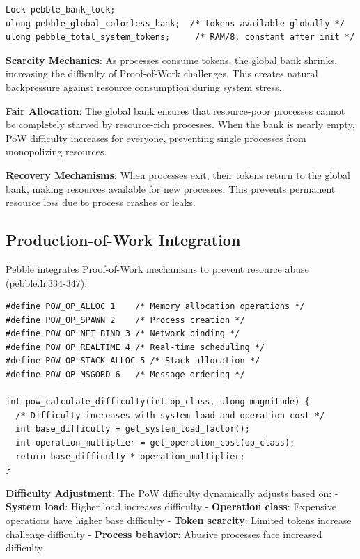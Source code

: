 \documentclass[11pt,letterpaper]{article}
\begin{document}
\begin{lstlisting}
Lock pebble_bank_lock;
ulong pebble_global_colorless_bank;  /* tokens available globally */
ulong pebble_total_system_tokens;     /* RAM/8, constant after init */
\end{lstlisting}

\textbf{Scarcity Mechanics}: As processes consume tokens, the global bank shrinks, increasing the difficulty of Proof-of-Work challenges. This creates natural backpressure against resource consumption during system stress.

\textbf{Fair Allocation}: The global bank ensures that resource-poor processes cannot be completely starved by resource-rich processes. When the bank is nearly empty, PoW difficulty increases for everyone, preventing single processes from monopolizing resources.

\textbf{Recovery Mechanisms}: When processes exit, their tokens return to the global bank, making resources available for new processes. This prevents permanent resource loss due to process crashes or leaks.

\subsection{Production-of-Work Integration}

Pebble integrates Proof-of-Work mechanisms to prevent resource abuse (pebble.h:334-347):

\begin{lstlisting}
#define POW_OP_ALLOC 1    /* Memory allocation operations */
#define POW_OP_SPAWN 2    /* Process creation */
#define POW_OP_NET_BIND 3 /* Network binding */
#define POW_OP_REALTIME 4 /* Real-time scheduling */
#define POW_OP_STACK_ALLOC 5 /* Stack allocation */
#define POW_OP_MSGORD 6   /* Message ordering */

int pow_calculate_difficulty(int op_class, ulong magnitude) {
  /* Difficulty increases with system load and operation cost */
  int base_difficulty = get_system_load_factor();
  int operation_multiplier = get_operation_cost(op_class);
  return base_difficulty * operation_multiplier;
}
\end{lstlisting}

\textbf{Difficulty Adjustment}: The PoW difficulty dynamically adjusts based on:
- \textbf{System load}: Higher load increases difficulty
- \textbf{Operation class}: Expensive operations have higher base difficulty  
- \textbf{Token scarcity}: Limited tokens increase challenge difficulty
- \textbf{Process behavior}: Abusive processes face increased difficulty
\end{document}
